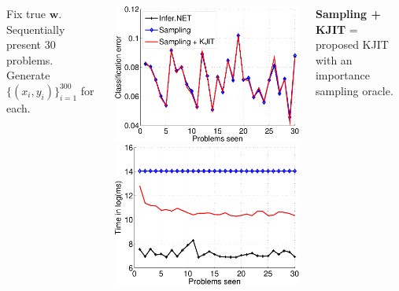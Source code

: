 \documentclass[25pt, a0paper, portrait, margin=0mm, innermargin=10mm,
     blockverticalspace=7mm, colspace=8mm, subcolspace=8mm]{tikzposter} %
\begin{document}
\begin{columns}
{    Fix true $\boldsymbol{w}$. Sequentially present 30 problems. Generate
    $\{(x_i, y_i)\}_{i=1}^{300}$ for each.  
\begin{tikzfigure}
  \hspace{-10cm}
  \includegraphics[width=13cm]{online/logistic_01_loss-crop}
  \hspace{2cm}
  \includegraphics[width=13cm]{online/logistic_inference_time-crop}
\end{tikzfigure}

\textbf{Sampling + KJIT} = proposed KJIT with an importance sampling oracle.

}
\end{columns}
\end{document}
